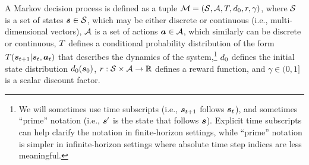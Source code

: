 \documentclass[../thesis.tex]{subfiles}
\begin{document}
\begin{definition}
A Markov decision process is defined as a tuple \mbox{$\mathcal{M} = (\mathcal{S},\mathcal{A},T,d_0,r,\gamma)$}, where $\mathcal{S}$ is a set of states $\boldsymbol{s} \in \mathcal{S}$, which may be either discrete or continuous (i.e., multi-dimensional vectors), $\mathcal{A}$ is a set of actions $\boldsymbol{a} \in \mathcal{A}$, which similarly can be discrete or continuous, $T$ defines a conditional probability distribution of the form $T(\boldsymbol{s}_{t+1} | \boldsymbol{s}_t, \boldsymbol{a}_t)$ that describes the dynamics of the system,\footnote{We will sometimes use time subscripts (i.e., $\boldsymbol{s}_{t+1}$ follows $\boldsymbol{s}_t$), and sometimes ``prime'' notation (i.e., $\boldsymbol{s}'$ is the state that follows $\boldsymbol{s}$). Explicit time subscripts can help clarify the notation in finite-horizon settings, while ``prime'' notation is simpler in infinite-horizon settings where absolute time step indices are less meaningful.} $d_0$ defines the initial state distribution $d_0(\boldsymbol{s}_0)$, $r : \mathcal{S} \times \mathcal{A} \rightarrow \mathbb{R}$ defines a reward function, and $\gamma \in (0, 1]$ is a scalar discount factor.
\end{definition}


\end{document}
